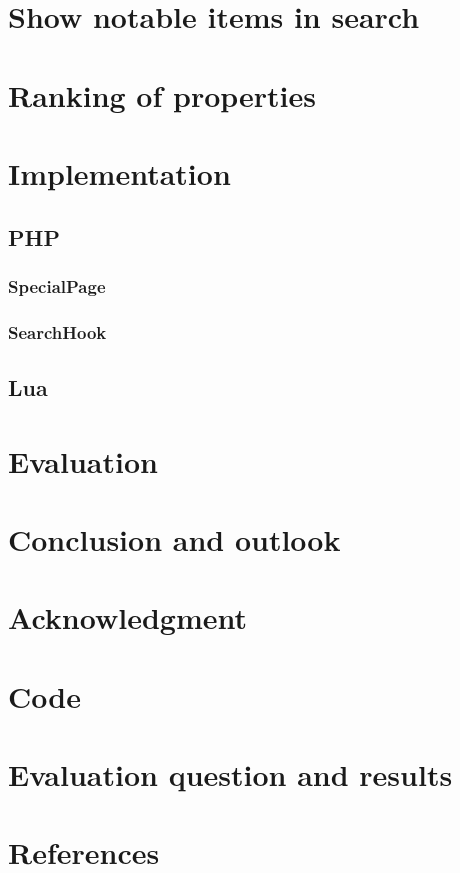 \documentclass[11pt]{article}
\begin{document}
\section {Show notable items in search}

\section {Ranking of properties}

\section{Implementation}

\subsection {PHP}

\subsubsection {SpecialPage}

\subsubsection {SearchHook}

\subsection {Lua}

\section{Evaluation}

\section{Conclusion and outlook}

\section{Acknowledgment}

\section{Code}

\section{Evaluation question and results}

\section{References}
\end{document}
